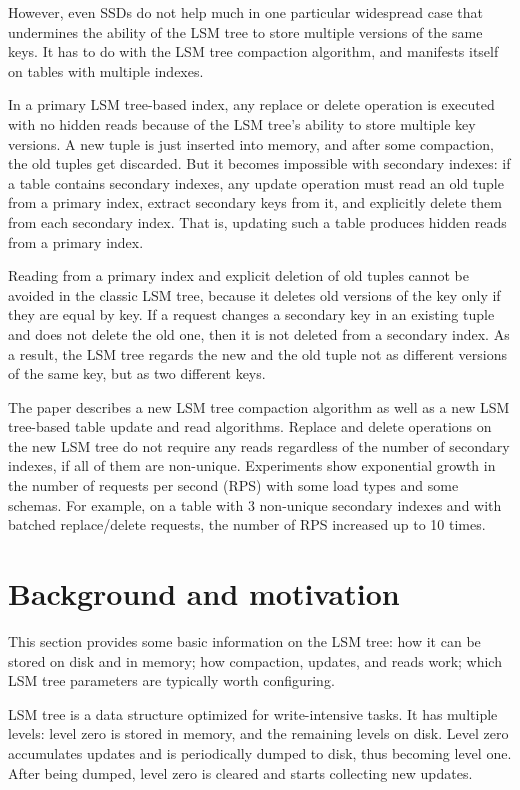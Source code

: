\documentclass{vldb}
\begin{document}
However, even SSDs do not help much in one particular widespread case that undermines
the ability of the LSM tree to store multiple versions of the same keys. It has to do
with the LSM tree compaction algorithm, and manifests itself on tables with multiple indexes.

In a primary LSM tree-based index, any replace or delete operation is executed
with no hidden reads because of the LSM tree's ability to store multiple key versions.
A new tuple is just inserted into memory, and after some compaction, the old
tuples get discarded. But it becomes impossible with secondary indexes: if a table
contains secondary indexes, any update operation must read an old tuple from a
primary index, extract secondary keys from it, and explicitly delete them from each
secondary index. That is, updating such a table produces hidden reads from a
primary index.

Reading from a primary index and explicit deletion of old tuples cannot be avoided in the
classic LSM tree, because it deletes old versions of the key only if they are
equal by key. If a request changes a secondary key in an existing tuple and
does not delete the old one, then it is not deleted from a secondary index.
As a result, the LSM tree regards the new and the old tuple not as different
versions of the same key, but as two different keys.

The paper describes a new LSM tree compaction algorithm as well as a new LSM
tree-based table update and read algorithms. Replace and delete operations on the new
LSM tree do not require any reads regardless of the number of secondary indexes, if all of them
are non-unique. Experiments show exponential growth in the number of requests per
second (RPS) with some load types and some schemas. For example, on a table with 3
non-unique secondary indexes and with batched replace/delete requests, the number of RPS
increased up to 10 times.

\section{Background and motivation}
This section provides some basic information on the LSM tree: how it can be
stored on disk and in memory; how compaction, updates, and reads work;
which LSM tree parameters are typically worth configuring.

LSM tree is a data structure optimized for write-intensive tasks. It has
multiple levels: level zero is stored in memory, and the remaining levels on disk.
Level zero accumulates updates and is periodically dumped to disk, thus becoming
level one. After being dumped, level zero is cleared and starts collecting new updates.
\end{document}
